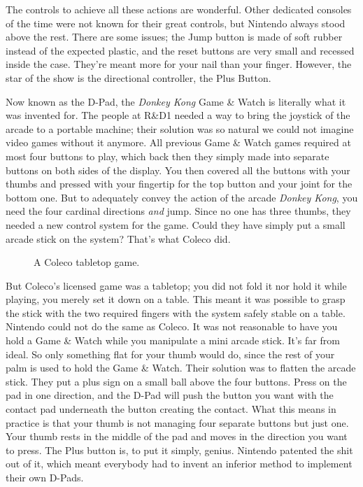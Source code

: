 \documentclass{book}
\begin{document}
The controls to achieve all these actions are wonderful. Other dedicated consoles of the time were not known for their great controls, but Nintendo always stood above the rest. There are some issues; the Jump button is made of soft rubber instead of the expected plastic, and the reset buttons are very small and recessed inside the case. They’re meant more for your nail than your finger. However, the star of the show is the directional controller, the Plus Button.\par
\FloatBarrier\vspace{\baselineskip}\begin{figure}[H]\end{figure}
Now known as the D-Pad, the \emph{Donkey Kong} Game \& Watch is literally what it was invented for. The people at R\&D1 needed a way to bring the joystick of the arcade to a portable machine; their solution was so natural we could not imagine video games without it anymore. All previous Game \& Watch games required at most four buttons to play, which back then they simply made into separate buttons on both sides of the display. You then covered all the buttons with your thumbs and pressed with your fingertip for the top button and your joint for the bottom one. But to adequately convey the action of the arcade \emph{Donkey Kong}, you need the four cardinal directions \emph{and} jump. Since no one has three thumbs, they needed a new control system for the game. Could they have simply put a small arcade stick on the system? That’s what Coleco did.\par
\FloatBarrier\vspace{\baselineskip}\begin{figure}[H]\caption*{A Coleco tabletop game.}\end{figure}
But Coleco’s licensed game was a tabletop; you did not fold it nor hold it while playing, you merely set it down on a table. This meant it was possible to grasp the stick with the two required fingers with the system safely stable on a table. Nintendo could not do the same as Coleco. It was not reasonable to have you hold a Game \& Watch while you manipulate a mini arcade stick. It’s far from ideal. So only something flat for your thumb would do, since the rest of your palm is used to hold the Game \& Watch. Their solution was to flatten the arcade stick. They put a plus sign on a small ball above the four buttons. Press on the pad in one direction, and the D-Pad will push the button you want with the contact pad underneath the button creating the contact. What this means in practice is that your thumb is not managing four separate buttons but just one. Your thumb rests in the middle of the pad and moves in the direction you want to press. The Plus button is, to put it simply, genius. Nintendo patented the shit out of it, which meant everybody had to invent an inferior method to implement their own D-Pads.\par
\end{document}
